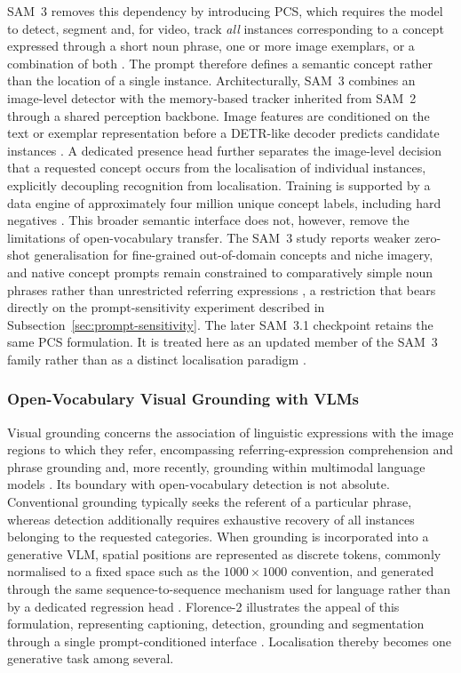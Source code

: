 \gls{SAM}~3 removes this dependency by introducing \gls{PCS}, which requires the model to detect, segment and, for video, track \emph{all} instances corresponding to a concept expressed through a short noun phrase, one or more image exemplars, or a combination of both \cite{meta2025sam3}. The prompt therefore defines a semantic concept rather than the location of a single instance. Architecturally, \gls{SAM}~3 combines an image-level detector with the memory-based tracker inherited from \gls{SAM}~2 through a shared perception backbone. Image features are conditioned on the text or exemplar representation before a \gls{DETR}-like decoder predicts candidate instances \cite{meta2025sam3}. A dedicated presence head further separates the image-level decision that a requested concept occurs from the localisation of individual instances, explicitly decoupling recognition from localisation. Training is supported by a data engine of approximately four million unique concept labels, including hard negatives \cite{meta2025sam3}. This broader semantic interface does not, however, remove the limitations of open-vocabulary transfer. The \gls{SAM}~3 study reports weaker zero-shot generalisation for fine-grained out-of-domain concepts and niche imagery, and native concept prompts remain constrained to comparatively simple noun phrases rather than unrestricted referring expressions \cite{meta2025sam3}, a restriction that bears directly on the prompt-sensitivity experiment described in Subsection~\ref{sec:prompt-sensitivity}. The later \gls{SAM}~3.1 checkpoint retains the same \gls{PCS} formulation. It is treated here as an updated member of the \gls{SAM}~3 family rather than as a distinct localisation paradigm \cite{meta2026sam31}.

\subsubsection{Open-Vocabulary Visual Grounding with \glspl{VLM}}
\label{sec:bg-vlm-grounding}
Visual grounding concerns the association of linguistic expressions with the image regions to which they refer, encompassing referring-expression comprehension and phrase grounding and, more recently, grounding within multimodal language models \cite{xiao2026grounding}. Its boundary with open-vocabulary detection is not absolute. Conventional grounding typically seeks the referent of a particular phrase, whereas detection additionally requires exhaustive recovery of all instances belonging to the requested categories. When grounding is incorporated into a generative \gls{VLM}, spatial positions are represented as discrete tokens, commonly normalised to a fixed space such as the \(1000\times1000\) convention, and generated through the same sequence-to-sequence mechanism used for language rather than by a dedicated regression head \cite{bulzan2026unlocking}. Florence-2 illustrates the appeal of this formulation, representing captioning, detection, grounding and segmentation through a single prompt-conditioned interface \cite{xiao2024florence2}. Localisation thereby becomes one generative task among several.

